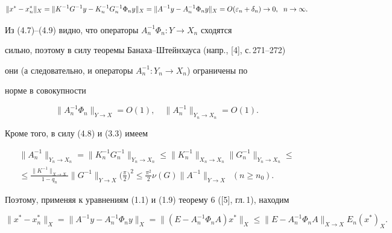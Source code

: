 \begin{equation}


\|x^*-x^*_n\|_X=


\|K^{-1}G^{-1}y-K^{-1}_n G^{-1}_n\Phi_ny\|_X=


\|A^{-1}y-A^{-1}_n\Phi_ny\|_{X}=O(\ve_n+\delta_n) \to 0,\ \; n \to \infty.


\end{equation}


Из (4.7)--(4.9) видно, что операторы $A^{-1}_n\Phi_n:Y \to X_n$ сходятся


сильно, поэтому в силу теоремы Банаха--Штейнхауса (напр., [4], с.\,271--272)


они (а следовательно, и операторы $A^{-1}_n:Y_n \to X_n$) ограничены по


норме в совокупности


\begin{equation}


\|A_n^{-1}\Phi_n\|_{Y\to X}=O(1),\quad


\|A_n^{-1}\|_{Y_n\to X_n}=O(1).


\end{equation}


Кроме того, в силу (4.8) и (3.3) имеем


\begin{multline}


\|A_n^{-1}\|_{Y_n \to X_n}=\|K_n^{-1}G^{-1}_n\|_{Y_n \to X_n}


\le \|K_n^{-1}\|_{X_n \to X_n}


\|G^{-1}_n\|_{Y_n \to X_n} \le\\


%


\le \frac{\|K^{-1}\|_{X \to X}}{1-q_n}\|G^{-1}\|_{Y \to X}


\bigg(\frac{\pi}{2}\bigg)^2 \le


\frac{\pi^2}{2}\nu(G)\|A^{-1}\|_{Y\to X}\ \; (n \ge n_0).


\end{multline}


Поэтому, применяя к уравнениям (1.1) и (1.9) теорему 6 ([5], гл.\,1), находим


\begin{equation}


\|x^*-x^*_n\|_X=\|A^{-1}y-A^{-1}_n\Phi_ny\|_X=


\|(E-A^{-1}_n\Phi_nA)x^*\|_X \le


\|E-A_n^{-1}\Phi_nA\|_{X \to X} E_n(x^*)_X.


\end{equation}


